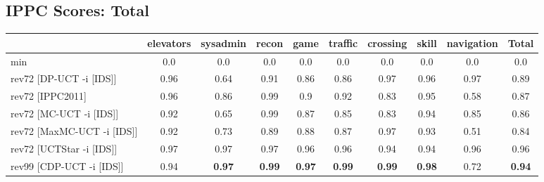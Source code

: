 \documentclass{article}
\begin{document}
\bigskip

\subsection*{IPPC Scores: Total}

\begin{tabular}{|l|r@{$\pm$}rr@{$\pm$}rr@{$\pm$}rr@{$\pm$}rr@{$\pm$}rr@{$\pm$}rr@{$\pm$}rr@{$\pm$}rr@{$\pm$}r|}
\hline

& \multicolumn{2}{c}{elevators}
& \multicolumn{2}{c}{sysadmin}
& \multicolumn{2}{c}{recon}
& \multicolumn{2}{c}{game}
& \multicolumn{2}{c}{traffic}
& \multicolumn{2}{c}{crossing}
& \multicolumn{2}{c}{skill}
& \multicolumn{2}{c}{navigation}
& \multicolumn{2}{c|}{Total}
\\
\hline
\hline
min
& \multicolumn{2}{c}{0.0}
& \multicolumn{2}{c}{0.0}
& \multicolumn{2}{c}{0.0}
& \multicolumn{2}{c}{0.0}
& \multicolumn{2}{c}{0.0}
& \multicolumn{2}{c}{0.0}
& \multicolumn{2}{c}{0.0}
& \multicolumn{2}{c}{0.0}
& \multicolumn{2}{c|}{0.0}
\\
rev72 [DP-UCT -i [IDS]]
& \multicolumn{2}{c}{0.96}
& \multicolumn{2}{c}{0.64}
& \multicolumn{2}{c}{0.91}
& \multicolumn{2}{c}{0.86}
& \multicolumn{2}{c}{0.86}
& \multicolumn{2}{c}{0.97}
& \multicolumn{2}{c}{0.96}
& \multicolumn{2}{c}{0.97}
& \multicolumn{2}{c|}{0.89}
\\
rev72 [IPPC2011]
& \multicolumn{2}{c}{0.96}
& \multicolumn{2}{c}{0.86}
& \multicolumn{2}{c}{0.99}
& \multicolumn{2}{c}{0.9}
& \multicolumn{2}{c}{0.92}
& \multicolumn{2}{c}{0.83}
& \multicolumn{2}{c}{0.95}
& \multicolumn{2}{c}{0.58}
& \multicolumn{2}{c|}{0.87}
\\
rev72 [MC-UCT -i [IDS]]
& \multicolumn{2}{c}{0.92}
& \multicolumn{2}{c}{0.65}
& \multicolumn{2}{c}{0.99}
& \multicolumn{2}{c}{0.87}
& \multicolumn{2}{c}{0.85}
& \multicolumn{2}{c}{0.83}
& \multicolumn{2}{c}{0.94}
& \multicolumn{2}{c}{0.85}
& \multicolumn{2}{c|}{0.86}
\\
rev72 [MaxMC-UCT -i [IDS]]
& \multicolumn{2}{c}{0.92}
& \multicolumn{2}{c}{0.73}
& \multicolumn{2}{c}{0.89}
& \multicolumn{2}{c}{0.88}
& \multicolumn{2}{c}{0.87}
& \multicolumn{2}{c}{0.97}
& \multicolumn{2}{c}{0.93}
& \multicolumn{2}{c}{0.51}
& \multicolumn{2}{c|}{0.84}
\\
rev72 [UCTStar -i [IDS]]
& \multicolumn{2}{c}{0.97}
& \multicolumn{2}{c}{0.97}
& \multicolumn{2}{c}{0.97}
& \multicolumn{2}{c}{0.96}
& \multicolumn{2}{c}{0.96}
& \multicolumn{2}{c}{0.94}
& \multicolumn{2}{c}{0.94}
& \multicolumn{2}{c}{0.96}
& \multicolumn{2}{c|}{0.96}
\\
\hline
rev99 [CDP-UCT -i [IDS]]
& \multicolumn{2}{c}{0.94}
& \multicolumn{2}{c}{\textbf{0.97}}
& \multicolumn{2}{c}{\textbf{0.99}}
& \multicolumn{2}{c}{\textbf{0.97}}
& \multicolumn{2}{c}{\textbf{0.99}}
& \multicolumn{2}{c}{\textbf{0.99}}
& \multicolumn{2}{c}{\textbf{0.98}}
& \multicolumn{2}{c}{0.72}
& \multicolumn{2}{c|}{\textbf{0.94}}
\\
\hline
\end{tabular}%

\bigskip
\end{document}

